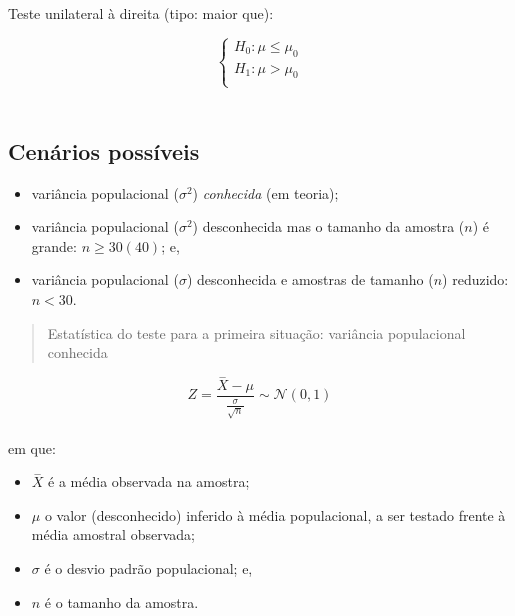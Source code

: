 \documentclass[
]{book}
\providecommand{\tightlist}{%
  \setlength{\itemsep}{0pt}\setlength{\parskip}{0pt}}
\begin{document}
Teste unilateral à direita (tipo: maior que):

\hfill\break
\[
\begin{cases}
    H_{0}: \mu \le \mu_{0}\\
    H_{1}: \mu > \mu_{0}\\
\end{cases}
\]\\

\hypertarget{cenuxe1rios-possuxedveis}{%
\subsection{Cenários possíveis}\label{cenuxe1rios-possuxedveis}}

\hfill\break

\begin{itemize}
\tightlist
\item
  variância populacional (\(\sigma^2\)) \emph{conhecida} (em teoria);\\
\item
  variância populacional (\(\sigma^2\)) desconhecida mas o tamanho da amostra (\(n\)) é grande: \(n\ge 30 (40)\); e,\\
\item
  variância populacional (\(\sigma\)) desconhecida e amostras de tamanho (\(n\)) reduzido: \(n < 30\).
\end{itemize}

\hfill\break

\begin{quote}
Estatística do teste para a primeira situação: variância populacional conhecida
\end{quote}

\[
Z = \frac{\stackrel{-}{X} - \mu}{\frac{\sigma}{\sqrt{n}}} \sim  \mathcal{N}(0,1)
\]\\

em que:

\hfill\break

\begin{itemize}
\tightlist
\item
  \(\stackrel{-}{X}\) é a média observada na amostra;\\
\item
  \(\mu\) o valor (desconhecido) inferido à média populacional, a ser testado frente à média amostral observada;\\
\item
  \(\sigma\) é o desvio padrão populacional; e,\\
\item
  \(n\) é o tamanho da amostra.
\end{itemize}
\end{document}
